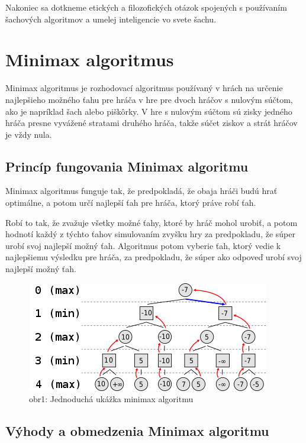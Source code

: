 \documentclass[10pt,twoside,slovak,a4paper]{article}
\begin{document}
Nakoniec sa dotkneme etických a filozofických otázok spojených s používaním šachových algoritmov a umelej inteligencie vo svete šachu.


\section{Minimax algoritmus} \label{minimax}
Minimax algoritmus je rozhodovací algoritmus používaný v hrách na určenie najlepšieho možného ťahu pre hráča v hre pre dvoch hráčov s nulovým súčtom, ako je napríklad šach alebo piškôrky. V hre s nulovým súčtom sú zisky jedného hráča presne vyvážené stratami druhého hráča, takže súčet ziskov a strát hráčov je vždy nula. 




\subsection{Princíp fungovania Minimax algoritmu} \label{principMinimax}
Minimax algoritmus funguje tak, že predpokladá, že obaja hráči budú hrať optimálne, a potom určí najlepší ťah pre hráča, ktorý práve robí ťah. 

Robí to tak, že zvažuje všetky možné ťahy, ktoré by hráč mohol urobiť, a potom hodnotí každý z týchto ťahov simulovaním zvyšku hry za predpokladu, že súper urobí svoj najlepší možný ťah. Algoritmus potom vyberie ťah, ktorý vedie k najlepšiemu výsledku pre hráča, za predpokladu, že súper ako odpoveď urobí svoj najlepší možný ťah.
\begin{figure}[h]
    \centering
    \includegraphics[width=\textwidth]{minimax}
    \caption{obr1: Jednoduchá ukážka minimax algoritmu}
    \label{obr1}
\end{figure}

\subsection{Výhody a obmedzenia Minimax algoritmu} \label {vyhodyMinimax}
\end{document}
